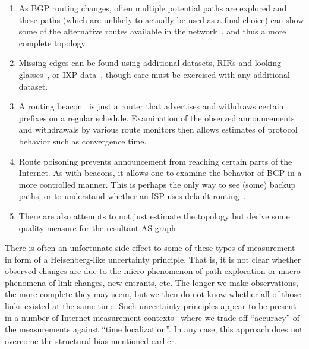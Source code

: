 \begin{enumerate}

\item As BGP routing changes, often
  multiple potential paths are explored and these paths (which are
  unlikely to actually be used as a final choice) can show some of the
  alternative routes available in the
  network~\cite{zhang05:_collec_inter_as_topol}, and thus a more
  complete topology.

\item Missing edges can be found using additional datasets, \eg RIRs
  and looking glasses~\cite{chang04:_towards,zhang05:_collec_inter_as_topol,he07,he09:_lord_of_links},
  or IXP data~\cite{he07,he09:_lord_of_links,augustin09:_ixps,sanchez13:_dasu},
  though care must be exercised with any additional dataset.

\item A routing beacon~\cite{labovitzSig97,mao03:_bgp_beacon,bush09:_inter_optom}
  is just a router that advertises and withdraws
  certain prefixes on a regular schedule. Examination of the observed
  announcements and withdrawals by various route monitors then allows
  estimates of protocol behavior such as convergence time. 

\item Route poisoning prevents announcement from reaching
  certain parts of the Internet. As with beacons, it allows one to
  examine the behavior of BGP in a more controlled manner. This is perhaps 
  the only way to see (some) backup paths, or to understand whether an ISP uses default
  routing~\cite{colitti06:_poison,bush09:_inter_optom}.

\item There are also attempts to not just estimate the topology
  but derive some quality measure for the resultant
  AS-graph~\cite{inter_as_level_topol_const_analy,winter09:_model_inter_routin_topol_with,roughan08:_bigfoot}.
 
\end{enumerate}

There is often an unfortunate side-effect to some of these types of measurement in
form of a Heisenberg-like uncertainty principle. That is, it is not clear
whether observed changes are due to the micro-phenomenon of path
exploration or macro-phenomena of link changes, new entrants, etc.
The longer we make observations, the more complete they may seem,
but we then do not know whether all of those links existed at the
same time. Such uncertainty principles appear to be present in a
number of Internet measurement contexts~\cite{roughan05:_fundamental} 
where we trade off ``accuracy'' of the measurements against ``time localization''.
In any case, this approach does not overcome the structural bias mentioned earlier. 

